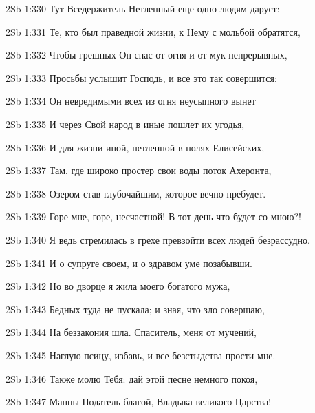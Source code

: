 \vs 2Sb 1:330 Тут Вседержитель Нетленный еще одно людям дарует: 

\vs 2Sb 1:331 Те, кто был праведной жизни, к Нему с мольбой обратятся, 

\vs 2Sb 1:332 Чтобы грешных Он спас от огня и от мук непрерывных,  

\vs 2Sb 1:333 Просьбы услышит Господь, и все это так совершится: 

\vs 2Sb 1:334 Он невредимыми всех из огня неусыпного вынет

\vs 2Sb 1:335 И через Свой народ в иные пошлет их угодья, 

\vs 2Sb 1:336 И для жизни иной, нетленной в полях Елисейских, 

\vs 2Sb 1:337 Там, где широко простер свои воды поток Ахеронта, 

\vs 2Sb 1:338 Озером став глубочайшим, которое вечно пребудет. 

\vs 2Sb 1:339 Горе мне, горе, несчастной! В тот день что будет со мною?!

\vs 2Sb 1:340 Я ведь стремилась в грехе превзойти всех людей безрассудно.

\vs 2Sb 1:341 И о супруге своем, и о здравом уме позабывши. 

\vs 2Sb 1:342 Но во дворце я жила моего богатого мужа, 

\vs 2Sb 1:343 Бедных туда не пускала; и зная, что зло совершаю, 

\vs 2Sb 1:344 На беззакония шла. Спаситель, меня от мучений,

\vs 2Sb 1:345 Наглую псицу, избавь, и все безстыдства прости мне. 

\vs 2Sb 1:346 Также молю Тебя: дай этой песне немного покоя, 

\vs 2Sb 1:347 Манны Податель благой, Владыка великого Царства!
